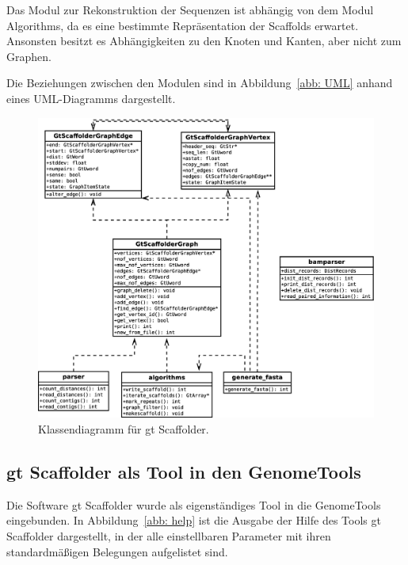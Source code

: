 \documentclass[a4paper,11pt,parskip,abstract=on]{scrartcl}
\begin{document}
Das Modul zur Rekonstruktion der Sequenzen ist abhängig von dem
Modul Algorithms, da es eine bestimmte Repräsentation der Scaffolds
erwartet. Ansonsten besitzt es Abhängigkeiten zu den Knoten und Kanten,
aber nicht zum Graphen.

Die Beziehungen zwischen den Modulen sind in Abbildung~\ref{abb:
  UML} anhand eines UML-Diagramms dargestellt.

\begin{figure}
  \centering
  \includegraphics[width=1\linewidth]{uml2.eps}
  \caption{Klassendiagramm für gt Scaffolder.}
\label{abb: UML}
\end{figure}

\subsection{gt Scaffolder als Tool in den GenomeTools}
Die Software gt Scaffolder wurde als eigenständiges Tool in die GenomeTools
eingebunden. In Abbildung~\ref{abb: help} ist die Ausgabe der Hilfe des Tools
gt Scaffolder dargestellt, in der alle einstellbaren Parameter mit ihren
standardmäßigen Belegungen aufgelistet sind.
\end{document}

